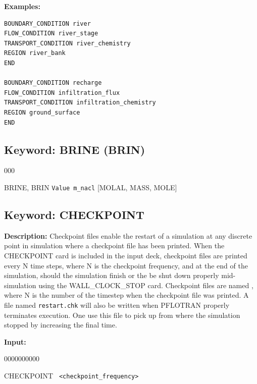 \documentclass[12pt]{article}
\begin{document}
\bigskip

{\noindent\bf Examples:}
\begin{verbatim}
BOUNDARY_CONDITION river
FLOW_CONDITION river_stage
TRANSPORT_CONDITION river_chemistry
REGION river_bank
END

BOUNDARY_CONDITION recharge
FLOW_CONDITION infiltration_flux
TRANSPORT_CONDITION infiltration_chemistry
REGION ground_surface
END
\end{verbatim}


\newpage
\protect\hypertarget{target_brine}{}

\subsection{Keyword: BRINE (BRIN)}

\begin{deflist}{000}
\item[BRINE, BRIN] {\tt Value m\_nacl} [MOLAL, MASS, MOLE]
\end{deflist}


\newpage
\protect\hypertarget{target_ckpt}{}

\subsection{Keyword: CHECKPOINT}
{\noindent\bf Description:}
Checkpoint files enable the restart of a simulation at any discrete point in simulation where a checkpoint file has been printed.  When the CHECKPOINT card is included in the input deck, checkpoint files are printed every N time steps, where N is the checkpoint frequency, and at the end of the simulation, should the simulation finish or the be shut down properly mid-simulation using the WALL\_CLOCK\_STOP card.  Checkpoint files are named , where N is the number of the timestep when the checkpoint file was printed.
A file named {\tt restart.chk} will also be written when PFLOTRAN properly terminates execution. One use this file to pick up from where the simulation stopped by increasing the final time.

{\noindent\bf Input:}

\begin{deflist}{0000000000}
\item [CHECKPOINT] \ {\tt <checkpoint\_frequency>}
\end{deflist}
\end{document}
